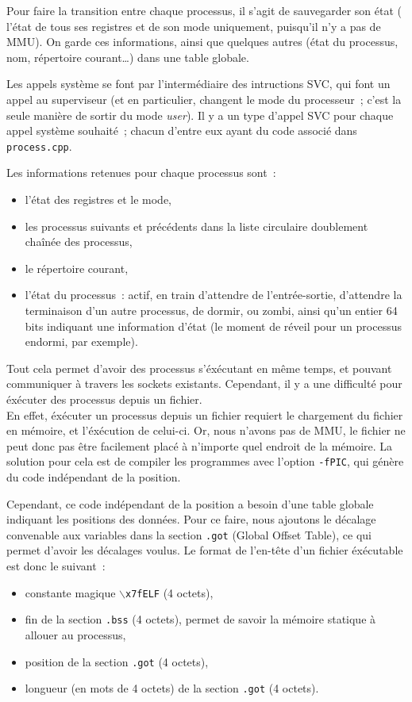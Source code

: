 \documentclass[11pt,a4paper]{article}
\newcommand{\fname}[1]{\texttt{#1}} %
\begin{document}
Pour faire la transition entre chaque processus, il s'agit de
sauvegarder son état (\ie{} l'état de tous ses registres et de son mode
uniquement, puisqu'il n'y a pas de MMU). On garde ces informations,
ainsi que quelques autres (état du processus, nom, répertoire
courant\ldots) dans une table globale.

Les appels système se font par l'intermédiaire des intructions SVC,
qui font un appel au superviseur (et en particulier, changent le mode
du processeur~; c'est la seule manière de sortir du mode
\textit{user}). Il y a un type d'appel SVC pour chaque appel système
souhaité~; chacun d'entre eux ayant du code associé dans
\fname{process.cpp}.

Les informations retenues pour chaque processus sont~:
\begin{itemize}
\item{l'état des registres et le mode,}
\item{les processus suivants et précédents dans la liste circulaire
  doublement chaînée des processus,}
\item{le répertoire courant,}
\item{l'état du processus~: actif, en train d'attendre de
  l'entrée-sortie, d'attendre la terminaison d'un autre processus,
  de dormir, ou zombi, ainsi qu'un entier 64 bits indiquant une
  information d'état (le moment de réveil pour un processus endormi,
  par exemple).}
\end{itemize}

Tout cela permet d'avoir des processus s'éxécutant en même temps, et
pouvant communiquer à travers les sockets existants. Cependant, il
y a une difficulté pour éxécuter des processus depuis un fichier.
\\

En effet, éxécuter un processus depuis un fichier requiert le
chargement du fichier en mémoire, et l'éxécution de celui-ci. Or, nous
n'avons pas de MMU, le fichier ne peut donc pas être facilement placé
à n'importe quel endroit de la mémoire. La solution pour cela est de
compiler les programmes avec l'option \texttt{-fPIC}, qui génère du
code indépendant de la position.

Cependant, ce code indépendant de la position a besoin d'une table
globale indiquant les positions des données. Pour ce faire, nous
ajoutons le décalage convenable aux variables dans la section
\texttt{.got} (Global Offset Table), ce qui permet d'avoir les
décalages voulus. Le format de l'en-tête d'un fichier éxécutable est
donc le suivant~:
\begin{itemize}
\item{constante magique \texttt{$\backslash{}$x7fELF} (4 octets),}
\item{fin de la section \texttt{.bss} (4 octets), permet de savoir la
  mémoire statique à allouer au processus,}
\item{position de la section \texttt{.got} (4 octets),}
\item{longueur (en mots de 4 octets) de la section \texttt{.got} (4 octets).\\}
\end{itemize}
\end{document}
